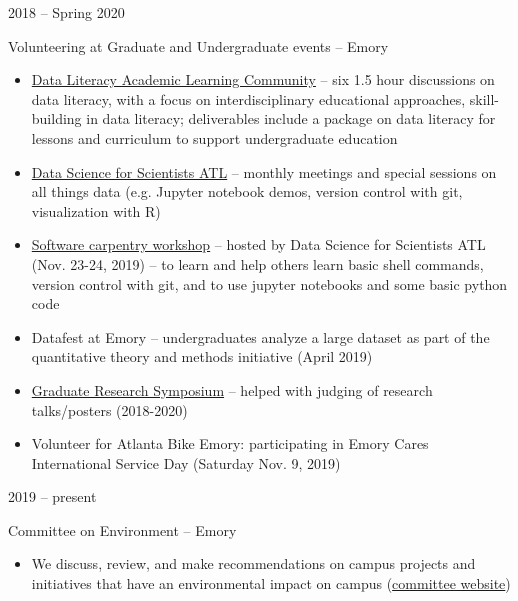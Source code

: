 \documentclass[a4paper,10pt]{article}
\newlength{\cvcolumngapwidth}
\newlength{\cvleftcolumnwidth}
\newlength{\cvrightcolumnwidth}
\newcommand{\cvtitlestyle}[1]{{\large\cvtitlefont\textcolor{cvtitlecolor}{#1}}}
\newcommand{\cvheadingstyle}[1]{{\normalsize\cvheadingfont\textcolor{cvheadingcolor}{#1}}}
\newlength{\cvafteritemskipamount}
\newlength{\cvaftertitleskipamount}
\newlength{\cvparskip}
\newcommand{\cvitem}[2]{
    \begin{minipage}[t]{\cvleftcolumnwidth}
        \raggedleft #1
    \end{minipage}%
    \hspace{\cvcolumngapwidth}%
    \begin{minipage}[t]{\cvrightcolumnwidth}
        \setlength{\parskip}{\cvparskip} #2
    \end{minipage}

    \vspace{\cvafteritemskipamount}
}
\newcommand{\cvtitle}[1]{
    \cvtitlestyle{#1}

    \vspace{\cvaftertitleskipamount}
    \vspace{-\cvparskip}
}
\begin{document}
\cvitem{
    \cvheadingstyle{2018 -- Spring 2020}
}{
    \cvtitle{Volunteering at Graduate and Undergraduate events -- Emory }

    \begin{itemize}[leftmargin=*]
    	\item \href{http://cfde.emory.edu/news-events/news/2019/november/data-literacy-alc.html}{Data Literacy Academic Learning Community} -- six 1.5 hour discussions on data literacy, with a focus on interdisciplinary educational approaches, skill-building in data literacy; deliverables include a package on data literacy for lessons and curriculum to support undergraduate education

	\item \href{https://data-science-for-scientists-atl.github.io/}{Data Science for Scientists ATL} -- monthly meetings and special sessions on all things data (e.g. Jupyter notebook demos, version control with git, visualization with R)
	
	\item \href{https://data-science-for-scientists-atl.github.io/2019-11-23-emory/}{Software carpentry workshop}  -- hosted by Data Science for Scientists ATL (Nov. 23-24, 2019) -- to learn and help others learn basic shell commands, version control with git, and to use jupyter notebooks and some basic python code
	
    	\item Datafest at Emory -- undergraduates analyze a large dataset as part of the quantitative theory and methods initiative (April 2019) 
		
    	\item \href{http://biomed.emory.edu/news-events/events/dsac-research-symposium.html}{Graduate Research Symposium} -- helped with judging of research talks/posters (2018-2020) 	

	\item Volunteer for Atlanta Bike Emory: participating in Emory Cares International Service Day (Saturday Nov. 9, 2019)

    \end{itemize}

}


\cvitem{
    \cvheadingstyle{2019 -- present}
}{
    \cvtitle{Committee on Environment -- Emory}
    \begin{itemize}[leftmargin=*]
    	\item We discuss, review, and make recommendations on campus projects and initiatives that have an environmental impact on campus (\href{https://www.senate.emory.edu/about/committees/environment.html}{committee website})
    \end{itemize}

}
\end{document}
